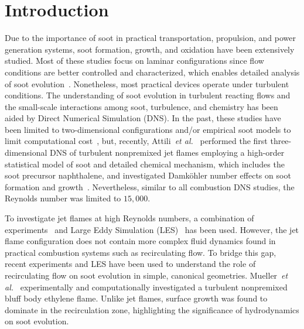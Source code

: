 \documentclass[review,3p,times]{elsarticle}
\begin{document}
\clearpage %

\section{Introduction}

Due to the importance of soot in practical transportation, propulsion, and power generation systems, soot formation, growth, and oxidation have been extensively studied.  Most of these studies focus on laminar configurations since flow conditions are better controlled and characterized, which enables detailed analysis of soot evolution~\cite{wang11}.  Nonetheless, most practical devices operate under turbulent conditions.  The understanding of soot evolution in turbulent reacting flows and the small-scale interactions among soot, turbulence, and chemistry has been aided by Direct Numerical Simulation (DNS).  In the past, these studies have been limited to two-dimensional configurations and/or empirical soot models to limit computational cost~\cite{yoo07,lignell07,lignell08,bisetti12}, but, recently, Attili~\emph{et al.}~\cite{attili14} performed the first three-dimensional DNS of turbulent nonpremixed jet flames employing a high-order statistical model of soot and detailed chemical mechanism, which includes the soot precursor naphthalene, and investigated Damk\"{o}hler number effects on soot formation and growth~\cite{attili15}.  Nevertheless, similar to all combustion DNS studies, the Reynolds number was limited to $15,000$.

To investigate jet flames at high Reynolds numbers, a combination of experiments~\cite{qamar05,qamar09,lee09,zhang11} and Large Eddy Simulation (LES)~\cite{eiasrag09,mueller12,xuan15} has been used.  However, the jet flame configuration does not contain more complex fluid dynamics found in practical combustion systems such as recirculating flow.  To bridge this gap, recent experiments and LES have been used to understand the role of recirculating flow on soot evolution in simple, canonical geometries.  Mueller~\emph{et al.}~\cite{mueller13} experimentally and computationally investigated a turbulent nonpremixed bluff body ethylene flame.  Unlike jet flames, surface growth was found to dominate in the recirculation zone, highlighting the significance of hydrodynamics on soot evolution.
 
\end{document}
